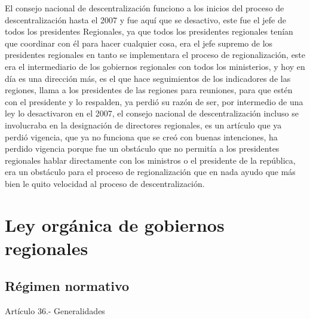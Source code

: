 \documentclass[
  letterpaper,
  DIV=11,
  numbers=noendperiod]{scrartcl}
\begin{document}
El consejo nacional de descentralización funciono a los inicios del
proceso de descentralización hasta el 2007 y fue aquí que se desactivo,
este fue el jefe de todos los presidentes Regionales, ya que todos los
presidentes regionales tenían que coordinar con él para hacer cualquier
cosa, era el jefe supremo de los presidentes regionales en tanto se
implementara el proceso de regionalización, este era el intermediario de
los gobiernos regionales con todos los ministerios, y hoy en día es una
dirección más, es el que hace seguimientos de los indicadores de las
regiones, llama a los presidentes de las regiones para reuniones, para
que estén con el presidente y lo respalden, ya perdió su razón de ser,
por intermedio de una ley lo desactivaron en el 2007, el consejo
nacional de descentralización incluso se involucraba en la designación
de directores regionales, es un artículo que ya perdió vigencia, que ya
no funciona que se creó con buenas intenciones, ha perdido vigencia
porque fue un obstáculo que no permitía a los presidentes regionales
hablar directamente con los ministros o el presidente de la república,
era un obstáculo para el proceso de regionalización que en nada ayudo
que más bien le quito velocidad al proceso de descentralización.

\hypertarget{ley-orguxe1nica-de-gobiernos-regionales}{%
\section{Ley orgánica de gobiernos
regionales}\label{ley-orguxe1nica-de-gobiernos-regionales}}

\hypertarget{ruxe9gimen-normativo}{%
\subsection{Régimen normativo}\label{ruxe9gimen-normativo}}

Artículo 36.- Generalidades
\end{document}
